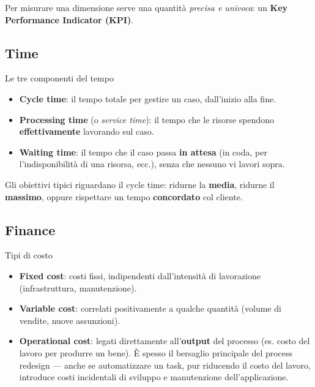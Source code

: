 Per misurare una dimensione serve una quantità \emph{precisa e univoca}: un \textbf{Key Performance Indicator (KPI)}.

\subsection{\texorpdfstring{Time}{Time}}

\begin{boxdefinition}{Le tre componenti del tempo}
\begin{itemize}
\item \textbf{Cycle time}: il tempo totale per gestire un caso, dall'inizio alla fine.
\item \textbf{Processing time} (o \emph{service time}): il tempo che le risorse spendono \textbf{effettivamente} lavorando sul caso.
\item \textbf{Waiting time}: il tempo che il caso passa \textbf{in attesa} (in coda, per l'indisponibilità di una risorsa, ecc.), senza che nessuno vi lavori sopra.
\end{itemize}

Gli obiettivi tipici riguardano il cycle time: ridurne la \textbf{media}, ridurne il \textbf{massimo}, oppure rispettare un tempo \textbf{concordato} col cliente.
\end{boxdefinition}

\subsection{\texorpdfstring{Finance}{Finance}}

\begin{boxnote}{Tipi di costo}
\begin{itemize}
\item \textbf{Fixed cost}: costi fissi, indipendenti dall'intensità di lavorazione (infrastruttura, manutenzione).
\item \textbf{Variable cost}: correlati positivamente a qualche quantità (volume di vendite, nuove assunzioni).
\item \textbf{Operational cost}: legati direttamente all'\textbf{output} del processo (es. costo del lavoro per produrre un bene). È spesso il bersaglio principale del process redesign — anche se automatizzare un task, pur riducendo il costo del lavoro, introduce costi incidentali di sviluppo e manutenzione dell'applicazione.
\end{itemize}
\end{boxnote}

